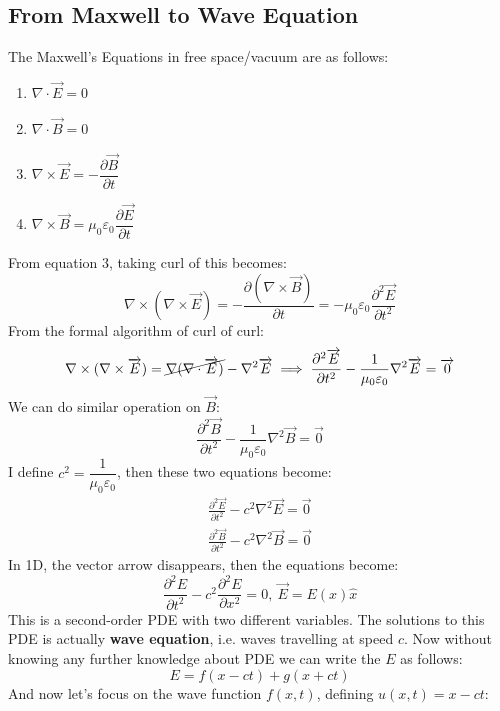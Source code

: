 \documentclass[12pt,a4paper,twoside]{article}
\numberwithin{equation}{section}
\begin{document}
\subsection{From Maxwell to Wave Equation}
The Maxwell's Equations in free space/vacuum are as follows:
\begin{enumerate}
    \item $\nabla \cdot \overrightarrow{E}=0$
    \item $\nabla \cdot \overrightarrow{B}=0$
    \item $\nabla \times \overrightarrow{E}=-\dfrac{\partial \overrightarrow{B}}{\partial t}$
    \item $\nabla \times \overrightarrow{B}=\mu_0\varepsilon_0\dfrac{\partial \overrightarrow{E}}{\partial t}$
\end{enumerate}
From equation 3, taking curl of this becomes:
\[\nabla\times(\nabla\times \overrightarrow{E})=-\frac{\partial(\nabla\times\overrightarrow{B})}{\partial t}=-\mu_0\varepsilon_0\frac{\partial^2\overrightarrow{E}}{\partial t^2}\]
From the formal algorithm of curl of curl:
\[\nabla \times (\nabla\times \overrightarrow{E})=\cancel{\nabla(\nabla\cdot\overrightarrow{E})}-\nabla^2\overrightarrow{E}\implies \frac{\partial^2\overrightarrow{E}}{\partial t^2}-\frac{1}{\mu_0\varepsilon_0}\nabla^2\overrightarrow{E}=\overrightarrow{0}\]
We can do similar operation on $\overrightarrow{B}$:
\[\frac{\partial^2\overrightarrow{B}}{\partial t^2}-\frac{1}{\mu_0\varepsilon_0}\nabla^2\overrightarrow{B}=\overrightarrow{0}\]
I define $c^2=\dfrac{1}{\mu_0\varepsilon_0}$, then these two equations become:
\begin{eqnarray}
    \frac{\partial^2\overrightarrow{E}}{\partial t^2}-c^2\nabla^2\overrightarrow{E}=\overrightarrow{0}\\
    \frac{\partial^2\overrightarrow{B}}{\partial t^2}-c^2\nabla^2\overrightarrow{B}=\overrightarrow{0}
\end{eqnarray}
In 1D, the vector arrow disappears, then the equations become:
\[\frac{\partial^2 E}{\partial t^2}-c^2\frac{\partial^2E}{\partial x^2}=0,\ \overrightarrow{E}=E(x)\hat{x}\]
This is a second-order PDE with two different variables. The solutions to this PDE is actually \textbf{wave equation}, i.e. waves travelling at speed $c$. Now without knowing any further knowledge about PDE we can write the $E$ as follows:
\[E=f(x-ct)+g(x+ct)\]
And now let's focus on the wave function $f(x,t)$, defining $u(x,t)=x-ct$:
\end{document}
